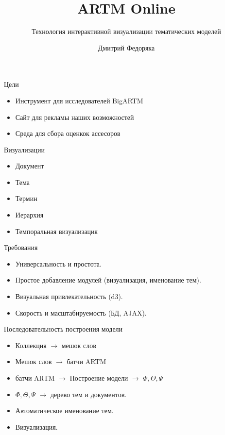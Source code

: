 \documentclass{beamer}
\title{ARTM Online}
\subtitle{Технология интерактивной визуализации тематических моделей}
\institute[МФТИ]{Московский физико-технический институт}
\author{Дмитрий Федоряка}
\begin{document}
\begin{frame}
\titlepage
\end{frame}
\begin{frame}{Цели}
		\begin{itemize}  
		\item Инструмент для исследователей BigARTM
		\item Сайт для рекламы наших возможностей
		\item Среда для сбора оценкок ассесоров
		\end{itemize}
\end{frame} 

\begin{frame}{Визуализации}
	\begin{itemize}  
			\item Документ
			\item Тема
			\item Термин
			\item Иерархия
			\item Темпоральная визуализация
	\end{itemize}
\end{frame} 

\begin{frame}{Требования}
	\begin{itemize}  
			\item Универсальность и простота.
			\item Простое добавление модулей (визуализация, именование тем).
			\item Визуальная привлекательность (d3).
			\item Скорость и масштабируемость (БД, AJAX).
	\end{itemize}
\end{frame} 


\begin{frame}{Последовательность построения модели}
		\begin{itemize}  
		\item Коллекция $\to$ мешок слов
		\item Мешок слов $\to$ батчи ARTM
		\item батчи ARTM $\to$ Построение модели $\to$ $\Phi, \Theta, \Psi$
		\item $\Phi, \Theta, \Psi$ $\to$ дерево тем и документов.	
		\item Автоматическое именование тем.
		\item Визуализация.
		\end{itemize}
\end{frame} 
\end{document}
